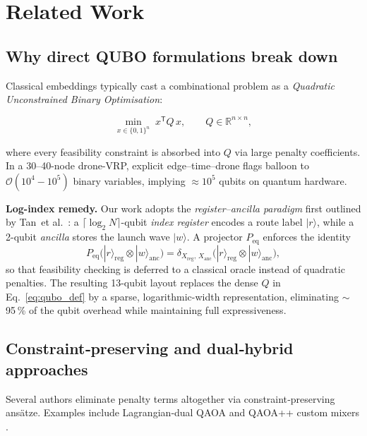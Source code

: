 \section{Related Work}
\label{sec:related_work}

\subsection{Why direct QUBO formulations break down}

Classical embeddings typically cast a combinational problem as a
\emph{Quadratic Unconstrained Binary Optimisation}:

\begin{equation}
\min_{x\in\{0,1\}^{n}} \; x^{\mathsf T} Q\,x,
\qquad
Q\in\mathbb{R}^{n\times n},
\label{eq:qubo_def}
\end{equation}

where every feasibility constraint is absorbed into $Q$ via large
penalty coefficients.
In a 30–40-node drone-VRP,
explicit edge–time–drone flags balloon to
$\mathcal{O}(10^{4}\!-\!10^{5})$ binary variables, implying
$\approx10^{5}$ qubits on quantum hardware.

\smallskip\noindent\textbf{Log-index remedy.}
Our work adopts the \emph{register–ancilla paradigm}
first outlined by Tan~et al.~\cite{tan_qubit-efficient_2021}:  
a $\lceil\log_2 N\rceil$-qubit \textit{index register} encodes a route
label $|r\rangle$, while a 2-qubit \textit{ancilla} stores the launch
wave $|w\rangle$.  
A projector $P_{\text{eq}}$ enforces the identity
\[
P_{\text{eq}}
\bigl(|r\rangle_{\text{reg}}\otimes|w\rangle_{\text{anc}}\bigr)
=
\delta_{X_{\text{reg}},\,X_{\text{anc}}}
\bigl(|r\rangle_{\text{reg}}\otimes|w\rangle_{\text{anc}}\bigr),
\]
so that feasibility checking is deferred to a classical oracle instead
of quadratic penalties.
The resulting 13-qubit layout replaces the dense $Q$ in
Eq.~\eqref{eq:qubo_def} by a sparse, logarithmic-width representation,
eliminating $\sim$95 \% of the qubit overhead while maintaining full
expressiveness.

\subsection{Constraint‑preserving and dual‑hybrid approaches}
Several authors eliminate penalty terms altogether via
constraint‑preserving ansätze.  Examples include Lagrangian‑dual QAOA
\cite{gabbassov_lagrangian_2025} and QAOA++ custom mixers \cite{fuchs_constrained_2022}.


